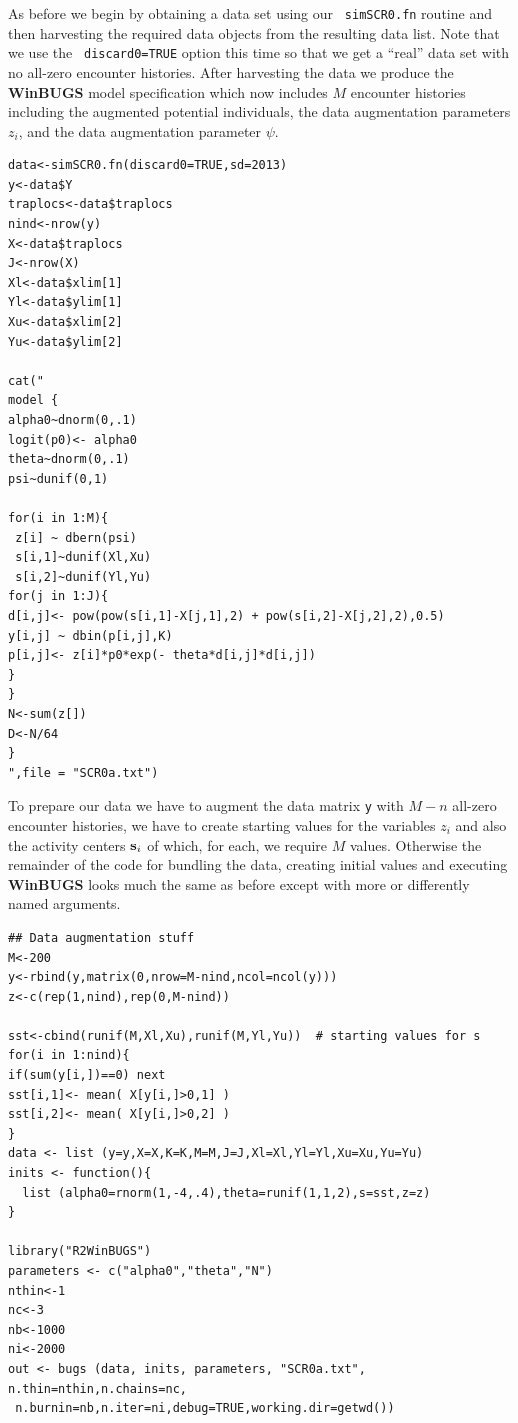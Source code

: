 As before we begin by obtaining a data set using our \mbox{\tt
  simSCR0.fn} routine and then harvesting the required data objects
from the resulting data list.  Note that we use the \mbox{\tt
  discard0=TRUE} option this time so that we get a ``real'' data set
with no all-zero encounter histories. After harvesting the data we
produce the {\bf WinBUGS} model specification which now includes $M$
encounter histories including the augmented potential individuals, the
data augmentation parameters $z_{i}$, and the data augmentation
parameter $\psi$.
{\small
\begin{verbatim}
data<-simSCR0.fn(discard0=TRUE,sd=2013)
y<-data$Y
traplocs<-data$traplocs
nind<-nrow(y)
X<-data$traplocs
J<-nrow(X)
Xl<-data$xlim[1]
Yl<-data$ylim[1]
Xu<-data$xlim[2]
Yu<-data$ylim[2]

cat("
model {
alpha0~dnorm(0,.1)
logit(p0)<- alpha0
theta~dnorm(0,.1)
psi~dunif(0,1)

for(i in 1:M){
 z[i] ~ dbern(psi)
 s[i,1]~dunif(Xl,Xu)
 s[i,2]~dunif(Yl,Yu) 
for(j in 1:J){
d[i,j]<- pow(pow(s[i,1]-X[j,1],2) + pow(s[i,2]-X[j,2],2),0.5)
y[i,j] ~ dbin(p[i,j],K)
p[i,j]<- z[i]*p0*exp(- theta*d[i,j]*d[i,j])
}
}
N<-sum(z[])
D<-N/64
}
",file = "SCR0a.txt")
\end{verbatim}
}

To prepare our data we have to augment the data matrix \mbox{\tt y}
with $M-n$ all-zero encounter histories, we have to create starting
values for the variables $z_{i}$ and also the activity centers ${\bf
  s}_{i}$ of which, for each, we require $M$ values. Otherwise the
remainder of the code for bundling the data, creating initial values
and executing {\bf WinBUGS} looks much the same as before except with more
or differently named arguments.
{\small
\begin{verbatim}
## Data augmentation stuff
M<-200
y<-rbind(y,matrix(0,nrow=M-nind,ncol=ncol(y)))
z<-c(rep(1,nind),rep(0,M-nind))

sst<-cbind(runif(M,Xl,Xu),runif(M,Yl,Yu))  # starting values for s
for(i in 1:nind){
if(sum(y[i,])==0) next
sst[i,1]<- mean( X[y[i,]>0,1] )
sst[i,2]<- mean( X[y[i,]>0,2] )
}
data <- list (y=y,X=X,K=K,M=M,J=J,Xl=Xl,Yl=Yl,Xu=Xu,Yu=Yu)
inits <- function(){
  list (alpha0=rnorm(1,-4,.4),theta=runif(1,1,2),s=sst,z=z)
}

library("R2WinBUGS")
parameters <- c("alpha0","theta","N")
nthin<-1
nc<-3
nb<-1000
ni<-2000
out <- bugs (data, inits, parameters, "SCR0a.txt", n.thin=nthin,n.chains=nc,
 n.burnin=nb,n.iter=ni,debug=TRUE,working.dir=getwd())
\end{verbatim}
}

